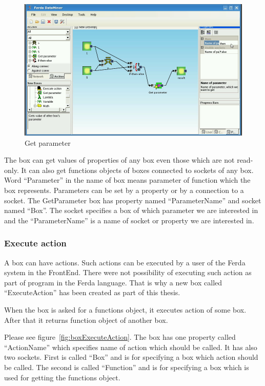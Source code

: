 \documentclass[a4paper,12pt]{book}
\begin{document}
\begin{figure}
	\includegraphics[width=1\textwidth]{getParameter2.png}
	\caption{Get parameter}
	\label{fig:boxGetParameter}
\end{figure}

The box can get values of properties of any box even those which are not read-only. It can also get functions objects of boxes connected to sockets of any box. Word ``Parameter'' in the name of box means parameter of function which the box represents. Parameters can be set by a property or by a connection to a socket. The GetParameter box has property named ``ParameterName'' and socket named ``Box''. The socket specifies a box of which parameter we are interested in and the ``ParameterName'' is a name of socket or property we are interested in.

\subsubsection{Execute action}
A box can have actions. Such actions can be executed by a user of the Ferda system in the FrontEnd. There were not possibility of executing such action as part of program in the Ferda language. That is why a new box called ``ExecuteAction'' has been created as part of this thesis.

When the box is asked for a functions object, it executes action of some box. After that it returns function object of another box.

Please see figure~\ref{fig:boxExecuteAction}. The box has one property called ``ActionName'' which specifies name of action which should be called. It has also two sockets. First is called ``Box'' and is for specifying a box which action should be called. The second is called ``Function'' and is for specifying a box which is used for getting the functions object.
\end{document}
